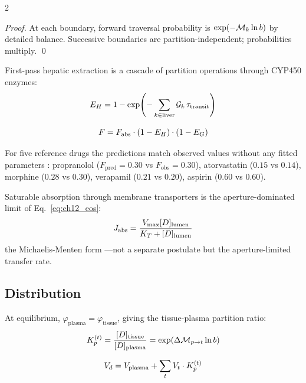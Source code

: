 \begin{multicols}{2}
\begin{proof}
At each boundary, forward traversal probability is $\exp(-\mathcal{M}_k\ln b)$ by detailed balance. Successive boundaries are partition-independent; probabilities multiply. \qed
\end{proof}

First-pass hepatic extraction is a cascade of partition operations through CYP450 enzymes:
\begin{equation}
E_H = 1 - \exp\!\left(-\sum_{k \in \mathrm{liver}}\mathcal{G}_k\,\tau_{\mathrm{transit}}\right)
\label{eq:ch12_eh}
\end{equation}

\begin{corollary}
\begin{equation}
F = F_{\mathrm{abs}}\cdot(1 - E_H)\cdot(1 - E_G)
\label{eq:ch12_bioavail}
\end{equation}
\end{corollary}

For five reference drugs the predictions match observed values without any fitted parameters \citep{rowland_tozer_2011}: propranolol ($F_{\mathrm{pred}} = 0.30$ vs $F_{\mathrm{obs}} = 0.30$), atorvastatin ($0.15$ vs $0.14$), morphine ($0.28$ vs $0.30$), verapamil ($0.21$ vs $0.20$), aspirin ($0.60$ vs $0.60$).

Saturable absorption through membrane transporters is the aperture-dominated limit of Eq.~\ref{eq:ch12_eos}:
\begin{equation}
J_{\mathrm{abs}} = \frac{V_{\max}[D]_{\mathrm{lumen}}}{K_T + [D]_{\mathrm{lumen}}}
\label{eq:ch12_mm}
\end{equation}
the Michaelis-Menten form \citep{michaelis_menten_1913}---not a separate postulate but the aperture-limited transfer rate.

\subsection{Distribution}

At equilibrium, $\varphi_{\mathrm{plasma}} = \varphi_{\mathrm{tissue}}$, giving the tissue-plasma partition ratio:
\begin{equation}
K_p^{(t)} = \frac{[D]_{\mathrm{tissue}}}{[D]_{\mathrm{plasma}}} = \exp\!\left(\Delta\mathcal{M}_{p\to t}\ln b\right)
\label{eq:ch12_kp}
\end{equation}

\begin{theorem}
\label{thm:ch12_vd}
\begin{equation}
V_d = V_{\mathrm{plasma}} + \sum_t V_t\cdot K_p^{(t)}
\label{eq:ch12_vd}
\end{equation}
\end{theorem}


\end{multicols}
